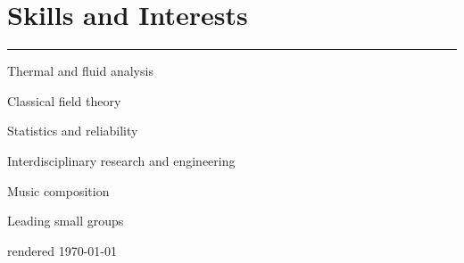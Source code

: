 \section{Skills and Interests}
\noindent\rule{\textwidth}{\hlinewidth}
	\begin{innerlist}
	\item Thermal and fluid analysis
	\item Classical field theory
	\item Statistics and reliability
	\item Interdisciplinary research and engineering
	\item Music composition
	\item Leading small groups
	\end{innerlist}
\vfill
\centering rendered \today

